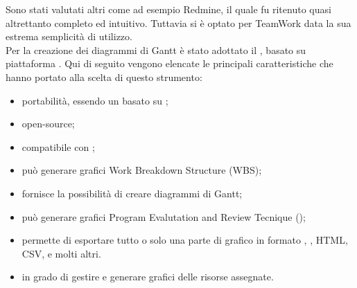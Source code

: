 			Sono stati valutati altri  come ad esempio Redmine, il quale fu ritenuto quasi altrettanto completo ed intuitivo. Tuttavia si è optato per TeamWork data la sua estrema semplicità di utilizzo.\\
	Per la creazione dei diagrammi di Gantt è stato adottato il  ,   basato su piattaforma . Qui di seguito vengono elencate le principali caratteristiche che hanno portato alla scelta di questo strumento:
	\begin{itemize}
		\item portabilità, essendo un  basato su ;
		\item open-source;
		\item compatibile con ;
		\item può generare grafici Work Breakdown Structure (WBS);
		\item fornisce la possibilità di creare diagrammi di Gantt;
		\item può generare grafici Program Evalutation and Review Tecnique ();
		\item permette di esportare tutto o solo una parte di grafico in formato , , HTML, CSV, e molti altri.
		\item in grado di gestire e generare grafici delle risorse assegnate.
	\end{itemize}
